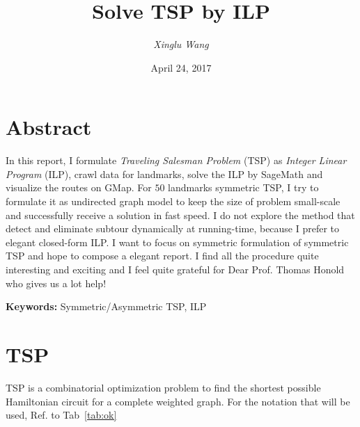 \documentclass{mcmthesis}
\title{Solve   TSP by ILP}
\author{{\itshape Xinglu Wang} \quad {\itshape 3140102282} \quad {\itshape ISEE 1403, ZJU}}
\begin{document}
\date{April 24, 2017}
\maketitle
 
\setcounter{tocdepth}{2} %
\tableofcontents
		
\section*{Abstract }
In this report, I  formulate \textit{Traveling Salesman Problem} (TSP) as  \textit{Integer Linear Program} (ILP),  crawl data for landmarks,  solve the ILP by SageMath and visualize the routes on GMap. 
For $50$ landmarks symmetric TSP, I try to formulate it as undirected graph model to keep the size of problem small-scale and successfully receive a solution in fast speed. 
I do not explore the method that detect and eliminate subtour dynamically at running-time, because I prefer to elegant closed-form ILP. I want to focus  on  symmetric formulation of symmetric TSP and hope to compose a elegant report. 
I find all the procedure  quite interesting and exciting and I feel quite grateful for Dear Prof. Thomas Honold who gives us a lot help!

\textbf{Keywords:} Symmetric/Asymmetric TSP, ILP
\section{TSP}
TSP is a combinatorial optimization problem to find the shortest possible Hamiltonian circuit for a complete weighted graph. For the notation that will be used, Ref. to Tab~\vref{tab:ok}
\end{document}
